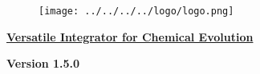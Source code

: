 
\begin{center} 
\begin{figure}[!h] 
\centering 
\texttt{[image: ../../../../logo/logo.png]} 
\end{figure} 
\underline{\LARGE \textbf{Versatile Integrator for Chemical Evolution}} 
\par 
{\Large \textbf{Version 1.5.0}} 
\end{center}
